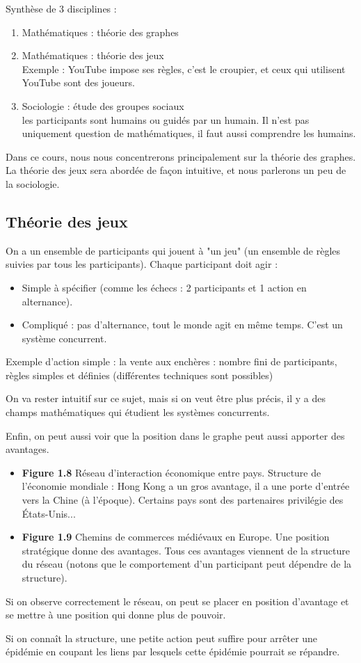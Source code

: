 Synthèse de 3 disciplines :
\begin{enumerate}

	\item Mathématiques : théorie des graphes
	\item Mathématiques : théorie des jeux\\
		Exemple : YouTube impose ses règles, c'est le croupier, et ceux qui utilisent YouTube sont des joueurs.
	\item Sociologie : étude des groupes sociaux\\
		les participants sont humains ou guidés par un humain. Il n'est pas uniquement question de mathématiques, il faut aussi comprendre les humains.
\end{enumerate}

Dans ce cours, nous nous concentrerons principalement sur la théorie des graphes. La théorie des jeux sera abordée de façon intuitive, et nous parlerons un peu de la sociologie.

\subsection{Théorie des jeux}
On a un ensemble de participants qui jouent à "un jeu" (un ensemble de règles suivies par tous les participants). Chaque participant doit agir : 

\begin{itemize}
\item Simple à spécifier (comme les échecs : 2 participants et 1 action en alternance). 
\item Compliqué : pas d'alternance, tout le monde agit en même temps. C'est un système concurrent.
\end{itemize}

Exemple d'action simple : la vente aux enchères : 
	nombre fini de participants,
	règles simples et définies (différentes techniques sont possibles)
	
\vspace{1cm}

On va rester intuitif sur ce sujet, mais si on veut être plus précis, il y a des champs mathématiques qui étudient les systèmes concurrents.

Enfin, on peut aussi voir que la position dans le graphe peut aussi apporter des avantages.

\begin{itemize}
	\item \textbf{Figure 1.8} Réseau d'interaction économique entre pays. Structure de l'économie mondiale : Hong Kong a un gros avantage, il a une porte d'entrée vers la Chine (à l'époque). Certains pays sont des partenaires privilégie des États-Unis... 
	\item \textbf{Figure 1.9} Chemins de commerces médiévaux en Europe. Une position stratégique donne des avantages. Tous ces avantages viennent de la structure du réseau (notons que le comportement d'un participant peut dépendre de la structure).
\end{itemize}

Si on observe correctement le réseau, on peut se placer en position d'avantage et se mettre à une position qui donne plus de pouvoir.

Si on connaît la structure, une petite action peut suffire pour arrêter une épidémie en coupant les liens par lesquels cette épidémie pourrait se répandre.
